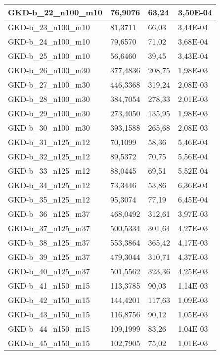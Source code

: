 \begin{table}[!ht]
\begin{adjustbox}{height=12cm}
\begin{tabular}{|l|l|l|l|}
        GKD-b\_22\_n100\_m10 & 76,9076 & 63,24 & 3,50E-04 \\ \hline
        GKD-b\_23\_n100\_m10 & 81,3711 & 66,03 & 3,44E-04 \\ \hline
        GKD-b\_24\_n100\_m10 & 79,6570 & 71,02 & 3,68E-04 \\ \hline
        GKD-b\_25\_n100\_m10 & 56,6460 & 39,45 & 3,43E-04 \\ \hline
        GKD-b\_26\_n100\_m30 & 377,4836 & 208,75 & 1,98E-03 \\ \hline
        GKD-b\_27\_n100\_m30 & 446,3368 & 319,24 & 2,08E-03 \\ \hline
        GKD-b\_28\_n100\_m30 & 384,7054 & 278,33 & 2,01E-03 \\ \hline
        GKD-b\_29\_n100\_m30 & 273,4050 & 135,95 & 1,98E-03 \\ \hline
        GKD-b\_30\_n100\_m30 & 393,1588 & 265,68 & 2,08E-03 \\ \hline
        GKD-b\_31\_n125\_m12 & 70,1099 & 58,36 & 5,46E-04 \\ \hline
        GKD-b\_32\_n125\_m12 & 89,5372 & 70,75 & 5,56E-04 \\ \hline
        GKD-b\_33\_n125\_m12 & 88,0445 & 69,51 & 5,52E-04 \\ \hline
        GKD-b\_34\_n125\_m12 & 73,3446 & 53,86 & 6,36E-04 \\ \hline
        GKD-b\_35\_n125\_m12 & 95,3074 & 77,19 & 6,45E-04 \\ \hline
        GKD-b\_36\_n125\_m37 & 468,0492 & 312,61 & 3,97E-03 \\ \hline
        GKD-b\_37\_n125\_m37 & 500,5334 & 301,64 & 4,27E-03 \\ \hline
        GKD-b\_38\_n125\_m37 & 553,3864 & 365,42 & 4,17E-03 \\ \hline
        GKD-b\_39\_n125\_m37 & 479,3044 & 310,71 & 4,37E-03 \\ \hline
        GKD-b\_40\_n125\_m37 & 501,5562 & 323,36 & 4,25E-03 \\ \hline
        GKD-b\_41\_n150\_m15 & 113,3785 & 90,03 & 1,14E-03 \\ \hline
        GKD-b\_42\_n150\_m15 & 144,4201 & 117,63 & 1,09E-03 \\ \hline
        GKD-b\_43\_n150\_m15 & 116,8756 & 90,12 & 1,05E-03 \\ \hline
        GKD-b\_44\_n150\_m15 & 109,1999 & 83,26 & 1,04E-03 \\ \hline
        GKD-b\_45\_n150\_m15 & 102,7905 & 75,02 & 1,01E-03 \\ \hline

\end{tabular}
\end{adjustbox}
\end{table}
